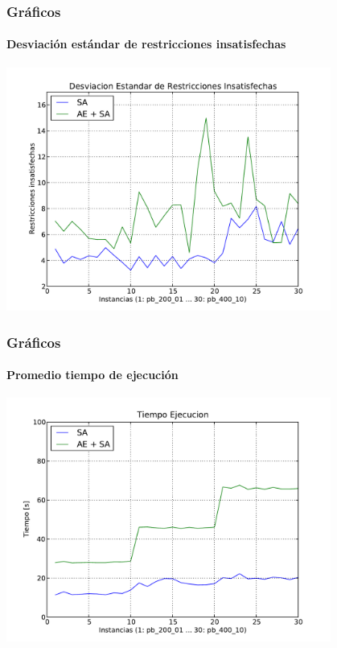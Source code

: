 \frame
{
\frametitle{Gráficos}
\framesubtitle{Desviación estándar de restricciones insatisfechas}
\begin{center}
	\includegraphics[width=0.8\textwidth]{img/s}
\end{center}
}
\frame
{
\frametitle{Gráficos}
\framesubtitle{Promedio tiempo de ejecución}
\begin{center}
	\includegraphics[width=0.8\textwidth]{img/tiempo}
\end{center}
}

